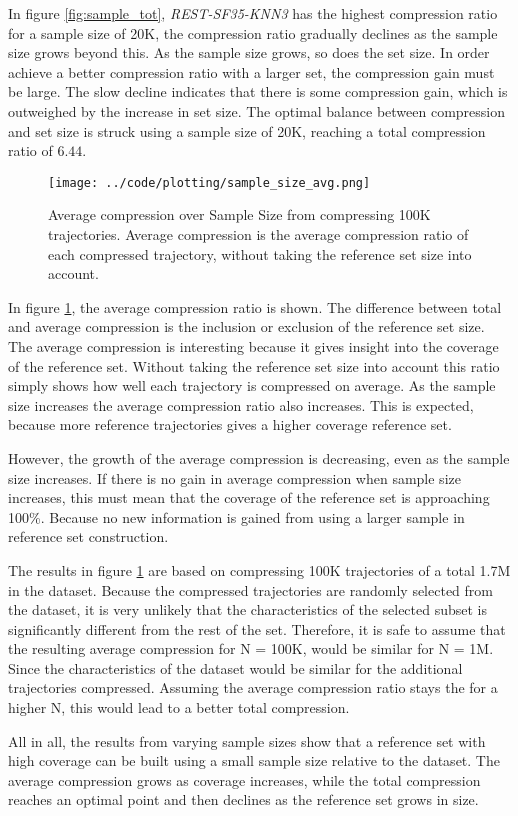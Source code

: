 In figure \ref{fig:sample_tot}, \textit{REST-SF35-KNN3} has the highest compression ratio for a sample size of 20K, the compression ratio gradually declines as the sample size grows beyond this. As the sample size grows, so does the set size. In order achieve a better compression ratio with a larger set, the compression gain must be large. The slow decline indicates that there is some compression gain, which is outweighed by the increase in set size. The optimal balance between compression and set size is struck using a sample size of 20K, reaching a total compression ratio of $6.44$.

\begin{figure}[h]
    \begin{minipage}{0.99\linewidth}
        \centering
        \texttt{[image: ../code/plotting/sample\_size\_avg.png]}
        \caption{Average compression over Sample Size from compressing 100K trajectories. Average compression is the average compression ratio of each compressed trajectory, without taking the reference set size into account.}
        \label{fig:sample_avg}
    \end{minipage}
\end{figure}

In figure \ref{fig:sample_avg}, the average compression ratio is shown. The difference between total and average compression is the inclusion or exclusion of the reference set size. The average compression is interesting because it gives insight into the coverage of the reference set. Without taking the reference set size into account this ratio simply shows how well each trajectory is compressed on average. As the sample size increases the average compression ratio also increases. This is expected, because more reference trajectories gives a higher coverage reference set.

However, the growth of the average compression is decreasing, even as the sample size increases. If there is no gain in average compression when sample size increases, this must mean that the coverage of the reference set is approaching 100\%. Because no new information is gained from using a larger sample in reference set construction.

The results in figure \ref{fig:sample_avg} are based on compressing 100K trajectories of a total 1.7M in the dataset. Because the compressed trajectories are randomly selected from the dataset, it is very unlikely that the characteristics of the selected subset is significantly different from the rest of the set. Therefore, it is safe to assume that the resulting average compression for N = 100K, would be similar for N = 1M. Since the characteristics of the dataset would be similar for the additional trajectories compressed. Assuming the average compression ratio stays the for a higher N, this would lead to a better total compression.

All in all, the results from varying sample sizes show that a reference set with high coverage can be built using a small sample size relative to the dataset. The average compression grows as coverage increases, while the total compression reaches an optimal point and then declines as the reference set grows in size.